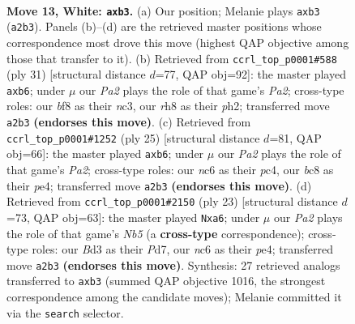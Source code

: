\documentclass[11pt]{article}
\begin{document}
\clearpage

\begin{figure}[p]\centering
\begin{subfigure}{0.46\textwidth}\centering
\resizebox{\linewidth}{!}{%
\newchessgame
\chessboard[
  setfen={r1b1kb1r/1pp3p1/2n5/p4p1p/3P4/1qPB1N2/P4PPP/R1B2RK1 w kq - 0 13},
  showmover=false,
  pgfstyle=straightmove, color=movearrow, markmove={a2-b3}
]}
\caption{}
\end{subfigure}\hfill
\begin{subfigure}{0.46\textwidth}\centering
\resizebox{\linewidth}{!}{%
\newchessgame
\chessboard[
  setfen={r1b2rk1/ppp2ppp/1Q1p1n2/8/2P5/2NP1PP1/PP4KP/R1B4R b - - 0 16},
  showmover=false,
  pgfstyle=straightmove, color=movearrow, markmove={a7-b6}
]}
\caption{}
\end{subfigure}
\\[4pt]
\begin{subfigure}{0.46\textwidth}\centering
\resizebox{\linewidth}{!}{%
\newchessgame
\chessboard[
  setfen={r4rk1/pp1bpp1p/1Q1p1np1/8/2P1P3/2N5/PP2BPPP/R3R1K1 b - - 0 13},
  showmover=false,
  pgfstyle=straightmove, color=movearrow, markmove={a7-b6}
]}
\caption{}
\end{subfigure}\hfill
\begin{subfigure}{0.46\textwidth}\centering
\resizebox{\linewidth}{!}{%
\newchessgame
\chessboard[
  setfen={r3kb1r/p2p2pp/Q3pn2/2p5/1n2P3/P1N5/1P3PPP/R1B1K1NR b KQkq - 0 12},
  showmover=false,
  pgfstyle=straightmove, color=movearrow, markmove={b4-a6}
]}
\caption{}
\end{subfigure}
\caption{\textbf{Move 13, White: \texttt{axb3}.} (a) Our position; Melanie plays \texttt{axb3} (\texttt{a2b3}). Panels (b)--(d) are the retrieved master positions whose correspondence most drove this move (highest QAP objective among those that transfer to it). (b) Retrieved from \texttt{ccrl\_top\_p0001\#588} (ply 31) [structural distance $d$=77, QAP obj=92]: the master played \texttt{axb6}; under $\mu$ our \emph{Pa2} plays the role of that game's \emph{Pa2}; cross-type roles: our \emph{b}f8 as their \emph{n}c3, our \emph{r}h8 as their \emph{p}h2; transferred move \texttt{a2b3} \textbf{(endorses this move)}. (c) Retrieved from \texttt{ccrl\_top\_p0001\#1252} (ply 25) [structural distance $d$=81, QAP obj=66]: the master played \texttt{axb6}; under $\mu$ our \emph{Pa2} plays the role of that game's \emph{Pa2}; cross-type roles: our \emph{n}c6 as their \emph{p}c4, our \emph{b}c8 as their \emph{p}e4; transferred move \texttt{a2b3} \textbf{(endorses this move)}. (d) Retrieved from \texttt{ccrl\_top\_p0001\#2150} (ply 23) [structural distance $d$=73, QAP obj=63]: the master played \texttt{Nxa6}; under $\mu$ our \emph{Pa2} plays the role of that game's \emph{Nb5} (a \textbf{cross-type} correspondence); cross-type roles: our \emph{B}d3 as their \emph{P}d7, our \emph{n}c6 as their \emph{p}e4; transferred move \texttt{a2b3} \textbf{(endorses this move)}. Synthesis: 27 retrieved analogs transferred to \texttt{axb3} (summed QAP objective 1016, the strongest correspondence among the candidate moves); Melanie committed it via the \texttt{search} selector.}
\label{fig:thought-m24}
\end{figure}
\end{document}
